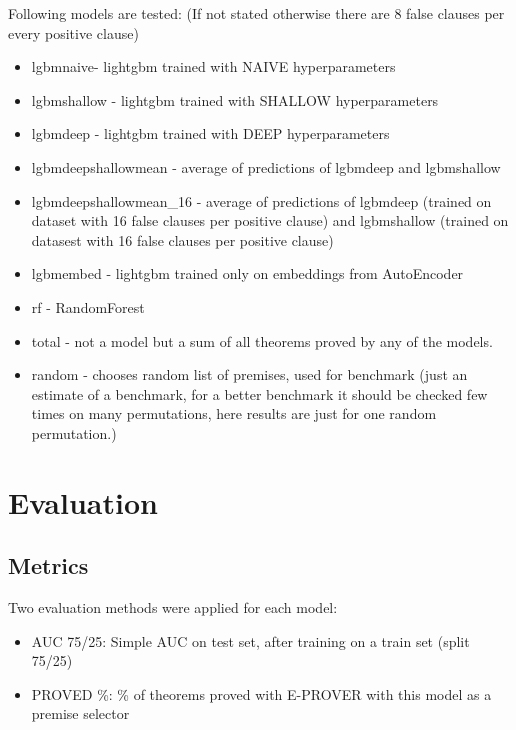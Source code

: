 \documentclass{article} %
\begin{document}
Following models are tested:
(If not stated otherwise there are 8 false clauses per every positive clause)
\begin{itemize}
\item lgbmnaive- lightgbm trained with NAIVE hyperparameters
\item lgbmshallow - lightgbm trained with SHALLOW hyperparameters
\item lgbmdeep - lightgbm trained with DEEP hyperparameters
\item lgbmdeepshallowmean - average of predictions of lgbmdeep and lgbmshallow
\item lgbmdeepshallowmean\_16 - average of predictions of lgbmdeep (trained on dataset with 16 false clauses per positive clause) and lgbmshallow (trained on datasest with 16 false clauses per positive clause)
\item lgbmembed - lightgbm trained only on embeddings from AutoEncoder
\item rf - RandomForest
\item total - not a model but a sum of all theorems proved by any of the models.
\item random - chooses random list of premises, used for benchmark (just an estimate of a benchmark, for a better benchmark it should be checked few times on many permutations, here results are just for one random permutation.)
\end{itemize}



\section{Evaluation}

\subsection{Metrics}

Two evaluation methods were applied for each model:

\begin{itemize}
\item AUC 75/25: Simple AUC on test set, after training on a train set (split 75/25)
\item PROVED \%: \% of theorems proved with E-PROVER with this model as a premise selector
\end{itemize}
\end{document}

